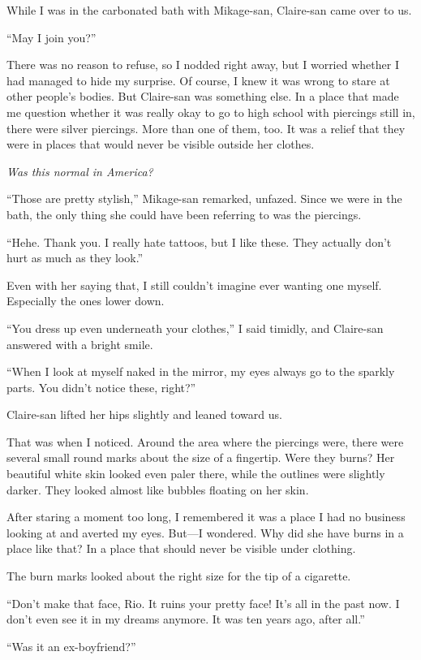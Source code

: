 \documentclass[
    a4paper,
    12pt,
    twoside,
    openany,
    UTF8,
    fontset=windows
]{ctexbook}
\begin{document}
While I was in the carbonated bath with Mikage-san, Claire-san came over to us.

``May I join you?''

There was no reason to refuse, so I nodded right away, but I worried whether I had managed to hide my surprise. Of course, I knew it was wrong to stare at other people's bodies. But Claire-san was something else. In a place that made me question whether it was really okay to go to high school with piercings still in, there were silver piercings. More than one of them, too. It was a relief that they were in places that would never be visible outside her clothes.

\textit{Was this normal in America?}

``Those are pretty stylish,'' Mikage-san remarked, unfazed. Since we were in the bath, the only thing she could have been referring to was the piercings.

``Hehe. Thank you. I really hate tattoos, but I like these. They actually don't hurt as much as they look.''

Even with her saying that, I still couldn't imagine ever wanting one myself. Especially the ones lower down.

``You dress up even underneath your clothes,'' I said timidly, and Claire-san answered with a bright smile.

``When I look at myself naked in the mirror, my eyes always go to the sparkly parts. You didn't notice these, right?''

Claire-san lifted her hips slightly and leaned toward us.

That was when I noticed. Around the area where the piercings were, there were several small round marks about the size of a fingertip. Were they burns? Her beautiful white skin looked even paler there, while the outlines were slightly darker. They looked almost like bubbles floating on her skin.

After staring a moment too long, I remembered it was a place I had no business looking at and averted my eyes. But---I wondered. Why did she have burns in a place like that? In a place that should never be visible under clothing.

The burn marks looked about the right size for the tip of a cigarette.

``Don't make that face, Rio. It ruins your pretty face! It's all in the past now. I don't even see it in my dreams anymore. It was ten years ago, after all.''

``Was it an ex-boyfriend?''
\end{document}
